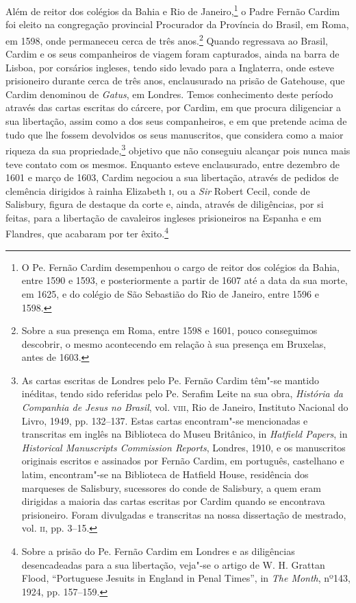 Além de reitor dos colégios da Bahia e Rio de Janeiro,\footnote{ O Pe. 
Fernão Cardim desempenhou o cargo de reitor dos colégios da
Bahia, entre 1590 e 1593, e posteriormente a partir de 1607 até a data
da sua morte, em 1625, e do colégio de São Sebastião do Rio de Janeiro,
entre 1596 e 1598.} o Padre Fernão Cardim foi eleito na congregação
provincial Procurador da Província do Brasil, em Roma, em 1598,
onde permaneceu cerca de três anos.\footnote{ Sobre a sua presença
em Roma, entre 1598 e 1601, pouco conseguimos descobrir, o mesmo
acontecendo em relação à sua presença em Bruxelas, antes de 1603.}
Quando regressava ao Brasil, Cardim e os seus companheiros de viagem
foram capturados, ainda na barra de Lisboa, por corsários ingleses,
tendo sido levado para a Inglaterra, onde esteve prisioneiro durante cerca
de três anos, enclausurado na prisão de Gatehouse, que Cardim denominou
de \textit{Gatus}, em Londres. Temos conhecimento deste período através
das cartas escritas do cárcere, por Cardim, em que procura diligenciar
a sua libertação, assim como a dos seus companheiros, e em que pretende
acima de tudo que lhe fossem devolvidos os seus manuscritos, que
considera como a maior riqueza da sua propriedade,\footnote{ As
cartas escritas de Londres pelo Pe. Fernão Cardim têm"-se mantido
inéditas, tendo sido referidas pelo Pe. Serafim Leite na sua obra,
\textit{História da Companhia de Jesus no Brasil}, vol. \textsc{viii}, Rio de
Janeiro, Instituto Nacional do Livro, 1949, pp. 132--137. Estas cartas
encontram"-se mencionadas e transcritas em inglês na Biblioteca do
Museu Britânico, in \textit{Hatfield Papers}, in \textit{Historical
Manuscripts Commission Reports}, Londres, 1910, e os manuscritos
originais escritos e assinados por Fernão Cardim, em português,
castelhano e latim, encontram"-se na Biblioteca de Hatfield
House, residência dos marqueses de Salisbury, sucessores do
conde de Salisbury, a quem eram dirigidas a maioria das cartas escritas
por Cardim quando se encontrava prisioneiro. Foram divulgadas
e transcritas na nossa dissertação de mestrado, vol. \textsc{ii}, pp. 3--15.}
objetivo que não conseguiu alcançar pois nunca mais teve contato com
os mesmos. Enquanto esteve enclausurado, entre dezembro de 1601 e março
de 1603, Cardim negociou a sua libertação, através de pedidos de
clemência dirigidos à rainha Elizabeth \textsc{i}, ou a \textit{Sir} Robert Cecil, conde de
Salisbury, figura de destaque da corte e, ainda, através de
diligências, por si feitas, para a libertação de cavaleiros ingleses
prisioneiros na Espanha e em Flandres, que acabaram por ter
êxito.\footnote{ Sobre a prisão do Pe. Fernão Cardim em Londres e
as diligências desencadeadas para a sua libertação, veja"-se o artigo de
W. H. Grattan Flood, ``Portuguese Jesuits in England in Penal Times'', in
\textit{The Month}, nº143, 1924, pp. 157--159.}

